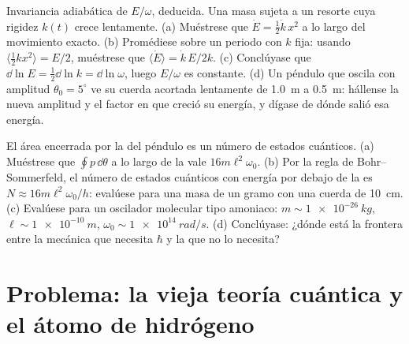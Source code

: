 \begin{exercise}[$\star\star\star$]\label{exo:b3:hamiltonian-mechanics:11}
Invariancia adiabática de $E/\omega$, deducida. Una masa sujeta a un resorte
cuya rigidez $k(t)$ crece lentamente. (a) Muéstrese que $\dot E = \tfrac12\dot k\,
x^2$ a lo largo del movimiento exacto. (b) Promédiese sobre un periodo con $k$
fija: usando $\langle\tfrac12 kx^2\rangle = E/2$, muéstrese que $\langle\dot E\rangle
= \dot k\,E/2k$. (c) Conclúyase que $\dd\ln E = \tfrac12\dd\ln k = \dd\ln
\omega$, luego $E/\omega$ es constante. (d) Un péndulo que oscila con
amplitud $\theta_0 = 5^\circ$ ve su cuerda acortada lentamente de
\qty{1.0}{m} a \qty{0.5}{m}: hállense la nueva amplitud y el factor en que
creció su energía, y dígase de dónde salió esa energía.
\end{exercise}

\begin{exercise}[$\star\star\star$]\label{exo:b3:hamiltonian-mechanics:12}
El área encerrada por la  del péndulo es un número de estados
cuánticos. (a) Muéstrese que $\oint p\,\dd\theta$ a lo largo de la
 vale $16m\ell^2\omega_0$. (b) Por la regla de Bohr--Sommerfeld,
el número de estados cuánticos con energía por debajo de la  es
$N \approx
16m\ell^2\omega_0/h$: evalúese para una masa de un gramo con una cuerda de
\qty{10}{cm}. (c) Evalúese para un oscilador molecular tipo amoniaco:
$m \sim \qty{1e-26}{kg}$, $\ell \sim \qty{1e-10}{m}$,
$\omega_0 \sim \qty{1e14}{rad/s}$. (d) Conclúyase: ¿dónde está la frontera
entre la mecánica que necesita $\hbar$ y la que no lo necesita?
\end{exercise}

\section{Problema: la vieja teoría cuántica y el átomo de hidrógeno}

